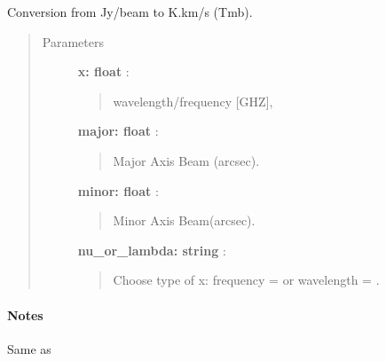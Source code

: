 \documentclass[a4paper,10pt,english]{sphinxmanual}
\begin{document}
\begin{fulllineitems}
\label{functions:astrolyze.functions.units.jansky_to_kelvin}
Conversion from Jy/beam to K.km/s (Tmb).
\begin{quote}\begin{description}
\item[{Parameters }] \leavevmode
\textbf{x: float} :
\begin{quote}

wavelength/frequency {[}GHZ{]},
\end{quote}

\textbf{major: float} :
\begin{quote}

Major Axis Beam (arcsec).
\end{quote}

\textbf{minor: float} :
\begin{quote}

Minor Axis Beam(arcsec).
\end{quote}

\textbf{nu\_or\_lambda: string} :
\begin{quote}

Choose type of x: frequency =  or wavelength = .
\end{quote}

\end{description}\end{quote}
\paragraph{Notes}

Same as {\hyperref[functions:astrolyze.functions.units.kelvin_to_jansky]{}}

\end{fulllineitems}
\end{document}
